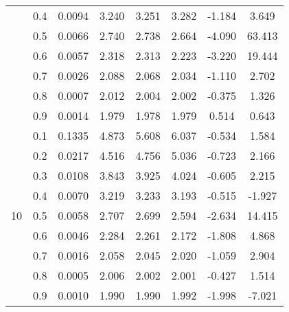 \documentclass[11pt,a4paper]{report}
\begin{document}
\begin{longtable}{ | c | c || c | c | c | c | c | c | }
 & 0.4 & 0.0094 & 3.240 & 3.251 & 3.282 & -1.184 & 3.649 \\
 & 0.5 & 0.0066 & 2.740 & 2.738 & 2.664 & -4.090 & 63.413 \\
 & 0.6 & 0.0057 & 2.318 & 2.313 & 2.223 & -3.220 & 19.444 \\
 & 0.7 & 0.0026 & 2.088 & 2.068 & 2.034 & -1.110 & 2.702 \\
 & 0.8 & 0.0007 & 2.012 & 2.004 & 2.002 & -0.375 & 1.326 \\
 & 0.9 & 0.0014 & 1.979 & 1.978 & 1.979 & 0.514 & 0.643 \\
 \hline
\multirow{9}{*}{10} & 0.1 & 0.1335 & 4.873 & 5.608 & 6.037 & -0.534 & 1.584 \\
 & 0.2 & 0.0217 & 4.516 & 4.756 & 5.036 & -0.723 & 2.166 \\
 & 0.3 & 0.0108 & 3.843 & 3.925 & 4.024 & -0.605 & 2.215 \\
 & 0.4 & 0.0070 & 3.219 & 3.233 & 3.193 & -0.515 & -1.927 \\
 & 0.5 & 0.0058 & 2.707 & 2.699 & 2.594 & -2.634 & 14.415 \\
 & 0.6 & 0.0046 & 2.284 & 2.261 & 2.172 & -1.808 & 4.868 \\
 & 0.7 & 0.0016 & 2.058 & 2.045 & 2.020 & -1.059 & 2.904 \\
 & 0.8 & 0.0005 & 2.006 & 2.002 & 2.001 & -0.427 & 1.514 \\
 & 0.9 & 0.0010 & 1.990 & 1.990 & 1.992 & -1.998 & -7.021 \\
 \hline
\hline
\end{longtable}
\end{document}
